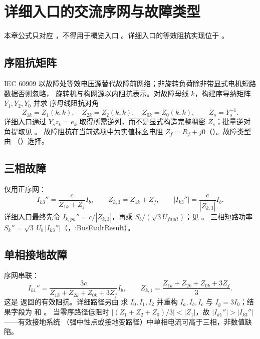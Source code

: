 \section{详细入口的交流序网与故障类型}\label{sec:sc-ac}

本章公式只对应 ，不得用于概览入口
。详细入口的等效阻抗实现位于
。

\subsection{序阻抗矩阵}
IEC 60909 以故障处等效电压源替代故障前网络；非旋转负荷除非带显式电机短路数据否则忽略，
旋转机与构网源以内阻抗表示。对故障母线 $k$，构建序导纳矩阵 $Y_1,Y_2,Y_0$ 并求
序母线阻抗对角
\begin{equation}
Z_{1k}=Z_1(k,k),\quad Z_{2k}=Z_2(k,k),\quad Z_{0k}=Z_0(k,k),\qquad Z_s=Y_s^{-1}.
\end{equation}
详细入口通过 $Y_s z_k=e_k$ 取得所需逆列，而不是显式构造完整稠密 $Z_s$；批量逆对角提取见
。
故障阻抗在当前选项中为实值标幺电阻 $Z_f=R_f+j0$（）。故障类型由
（）选择。

\subsection{三相故障}
仅用正序网：
\begin{equation}
I_{k3}''=\frac{c}{Z_{1k}+Z_f}I_b,\qquad Z_{k,3}=Z_{1k}+Z_f,\qquad |I_{k3}''|=\frac{c}{|Z_{k,3}|}I_b.
\end{equation}
详细入口最终先令 $I_{k,pu}''=c/|Z_{k,3}|$，再乘
$S_b/(\sqrt3U_{fault})$；见 。
三相短路功率 $S_k''=\sqrt3\,U_b\,|I_{k3}''|$（，:BusFaultResult）。

\subsection{单相接地故障}
序网串联：
\begin{equation}
I_{k1}''=\frac{3c}{Z_{1k}+Z_{2k}+Z_{0k}+3Z_f}I_b,\qquad
Z_{k,1}=\frac{Z_{1k}+Z_{2k}+Z_{0k}+3Z_f}{3}.
\end{equation}
这是  返回的有效阻抗。详细路径另由
 求 $I_0,I_1,I_2$ 并重构 $I_a,I_b,I_c$ 与
$I_g=3I_0$；结果字段为  和 。
当零序路径低阻时 $|(Z_1{+}Z_2{+}Z_0)/3|<|Z_1|$，故 $|I_{k1}''|>|I_{k3}''|$——有效接地系统
（强中性点或接地变路径）中单相电流可高于三相，非数值缺陷。

